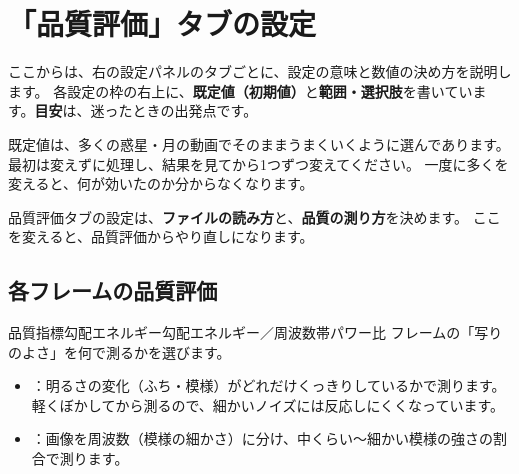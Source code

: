 \chapter{「品質評価」タブの設定}\label{chap:quality}

ここからは、右の設定パネルのタブごとに、設定の意味と数値の決め方を説明します。
各設定の枠の右上に、\textbf{既定値（初期値）}と\textbf{範囲・選択肢}を書いています。\textbf{\color{lsblue}目安}は、迷ったときの出発点です。

\begin{point}[まずは既定値で]
  既定値は、多くの惑星・月の動画でそのままうまくいくように選んであります。最初は変えずに処理し、結果を見てから1つずつ変えてください。
  一度に多くを変えると、何が効いたのか分からなくなります。
\end{point}

品質評価タブの設定は、\textbf{ファイルの読み方}と、\textbf{品質の測り方}を決めます。
ここを変えると、品質評価からやり直しになります。

\section{各フレームの品質評価}


\begin{setting}{ 品質指標}{勾配エネルギー}{勾配エネルギー／周波数帯パワー比}
  フレームの「写りのよさ」を何で測るかを選びます。
  \begin{itemize}[itemsep=0pt, topsep=2pt]
    \item {}：明るさの変化（ふち・模様）がどれだけくっきりしているかで測ります。軽くぼかしてから測るので、細かいノイズには反応しにくくなっています。
    \item {}：画像を周波数（模様の細かさ）に分け、中くらい〜細かい模様の強さの割合で測ります。
  \end{itemize}
\end{setting}

